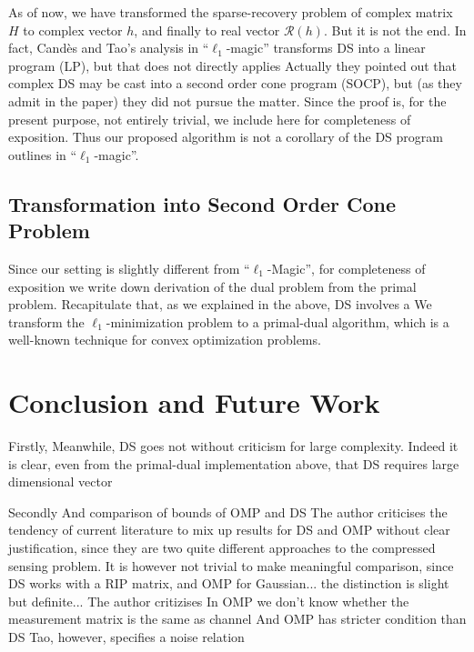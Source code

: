 \documentclass[12pt]{article}
\begin{document}
As of now, we have transformed the sparse-recovery problem of complex matrix \(H\) to complex vector \(h\), and finally to real vector \(\mathcal{R}(h)\).
But it is not the end.
In fact, Cand\`es and Tao's analysis in ``\(\ell_1\)-magic'' transforms DS into a linear program (LP), but that does not directly applies
Actually they pointed out that complex DS may be cast into a second order cone program (SOCP), but (as they admit in the paper) they did not pursue the matter.
Since the proof is, for the present purpose, not entirely trivial, we include here for completeness of exposition.
Thus our proposed algorithm is not a corollary of the DS program outlines in ``\(\ell_1\)-magic''.

\subsection{Transformation into Second Order Cone Problem}

Since our setting is slightly different from ``\(\ell_1\)-Magic'', for completeness of exposition we write down derivation of the dual problem from the primal problem.
Recapitulate that, as we explained in the above, DS involves a 
We transform the \(\ell_1\)-minimization problem to a primal-dual algorithm, which is a well-known technique for convex optimization problems.




\section{Conclusion and Future Work}

Firstly,
Meanwhile, DS goes not without criticism for large complexity.
Indeed it is clear, even from the primal-dual implementation above, that DS requires large dimensional vector

Secondly
And comparison of bounds of OMP and DS
The author criticises the tendency of current literature to mix up results for DS and OMP without clear justification, since they are two quite different approaches to the compressed sensing problem.
It is however not trivial to make meaningful comparison, since DS works with a RIP matrix, and OMP for Gaussian... the distinction is slight but definite...
The author critizises In OMP we don't know whether the measurement matrix is the same as channel
And OMP has stricter condition than DS
Tao, however, specifies a noise relation
\end{document}
